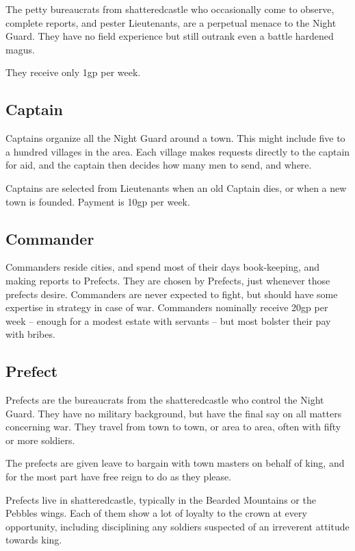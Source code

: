\begin{multicols}{2}
The petty bureaucrats from \gls{shatteredcastle} who occasionally come to observe, complete reports, and pester Lieutenants, are a perpetual menace to the Night Guard.
They have no field experience but still outrank even a battle hardened magus.

They receive only 1gp per week.

\subsection{Captain}

Captains organize all the Night Guard around a town.
This might include five to a hundred villages in the area.
Each village makes requests directly to the captain for aid, and the captain then decides how many men to send, and where.

Captains are selected from Lieutenants when an old Captain dies, or when a new town is founded.
Payment is 10gp per week.

\subsection{Commander}

Commanders reside cities, and spend most of their days book-keeping, and making reports to Prefects.
They are chosen by Prefects, just whenever those prefects desire.
Commanders are never expected to fight, but should have some expertise in strategy in case of war.
Commanders nominally receive 20gp per week -- enough for a modest estate with servants -- but most bolster their pay with bribes.

\subsection{Prefect}

Prefects are the bureaucrats from the \gls{shatteredcastle} who control the Night Guard.
They have no military background, but have the final say on all matters concerning war.
They travel from town to town, or area to area, often with fifty or more soldiers.

The prefects are given leave to bargain with town masters on behalf of \gls{king}, and for the most part have free reign to do as they please.

Prefects live in \gls{shatteredcastle}, typically in the Bearded Mountains or the Pebbles wings.
Each of them show a lot of loyalty to the crown at every opportunity, including disciplining any soldiers suspected of an irreverent attitude towards \gls{king}.

\end{multicols}

